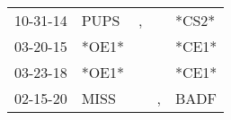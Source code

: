 \begin{supertabular}{p{0.07\textwidth}p{0.06\textwidth}p{0.02\textwidth}p{0.02\textwidth}p{0.06\textwidth}}
 10-31-14\textsuperscript{} &  PUPS\textsuperscript{} &  , &    &                   *CS2* \\
 03-20-15\textsuperscript{} &                   *OE1* &    &    &                   *CE1* \\
 03-23-18\textsuperscript{} &                   *OE1* &    &    &                   *CE1* \\
 02-15-20\textsuperscript{} &  MISS\textsuperscript{} &    &  , &  BADF\textsuperscript{} \\
\end{supertabular}
